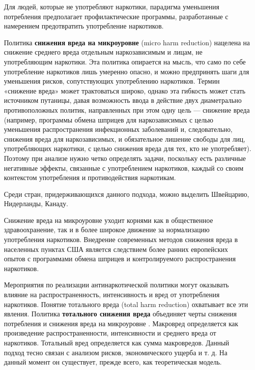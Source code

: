 \documentclass[a4paper,14pt]{article}
\begin{document}
Для людей, которые не употребляют наркотики, парадигма уменьшения потребления 
предполагает профилактические программы, разработанные с намерением 
предотвратить употребление наркотиков.

Политика \textbf{снижения вреда на микроуровне} (micro harm reduction) нацелена 
на снижение среднего вреда отдельным наркозависимым и лицам, не употребляющим 
наркотики. Эта политика опирается на мысль, что само по себе употребление 
наркотиков лишь умеренно опасно, и можно предпринять шаги для уменьшения рисков, 
сопутствующих употреблению наркотиков. Термин «снижение вреда» может 
трактоваться широко, однако эта гибкость может стать источником путаницы, давая 
возможность ввода в действие двух диаметрально противоположных политик, 
направленных при этом одну цель — снижение вреда (например, программы обмена 
шприцев для наркозависимых с целью уменьшения распространения инфекционных 
заболеваний и, следовательно, снижения вреда для наркозависимых, и обязательное 
лишение свободы для лиц, употребляющих наркотики, с целью снижения вреда для 
тех, кто не употребляет). Поэтому при анализе нужно четко определять задачи, 
поскольку есть различные негативные эффекты, связанные с употреблением 
наркотиков, каждый со своим контекстом употребления и противодействия 
наркотикам.

Среди стран, придерживающихся данного подхода, можно выделить Швейцарию, 
Нидерланды, Канаду.
 
Снижение вреда на микроуровне уходит корнями как в общественное здравоохранение, 
так и в более широкое движение за нормализацию употребления наркотиков. 
Внедрение современных методов снижения вреда в населенных пунктах США является 
следствием более ранних европейских опытов с программами обмена шприцев и 
контролируемого распространения наркотиков. 

Мероприятия по реализации антинаркотической политики могут оказывать влияние на 
распространенность, интенсивность и вред от употребления наркотиков. Понятие 
тотального вреда (total harm reduction) охватывает все эти явления. Политика 
\textbf{тотального снижения вреда} объединяет черты снижения потребления и 
снижения вреда на микроуровне \cite{MacCoun2001}. Макровред определяется как 
произведение  распространенности, интенсивности и среднего вреда от наркотиков. 
Тотальный вред определяется как сумма макровредов. Данный подход тесно связан с 
анализом рисков, экономического ущерба и т. д. На данный момент он существует, 
прежде всего, как теоретическая модель. 
\end{document}
